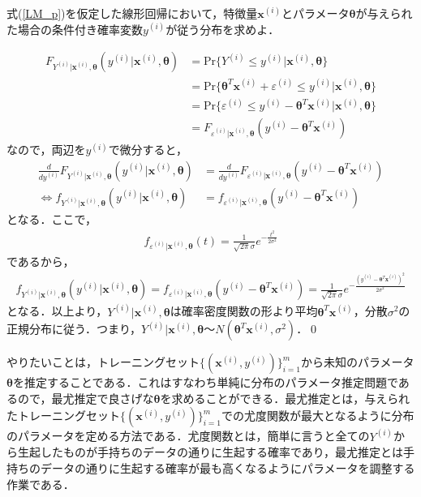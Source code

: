 \begin{qu}
式(\ref{LM_p})を仮定した線形回帰において，特徴量${\bm x}^{(i)}$とパラメータ${\bm \theta}$が与えられた場合の条件付き確率変数$y^{(i)}$が従う分布を求めよ．
\end{qu}
\begin{ans}
\begin{align*}
F_{Y^{(i)}|{\bm x}^{(i)},{\bm \theta}}(y^{(i)}|{\bm x}^{(i)},{\bm \theta})&=\mathrm{Pr}\{Y^{(i)} \leq y^{(i)}|{\bm x}^{(i)},{\bm \theta}\}	\\
&=\mathrm{Pr}\{{\bm \theta}^T {\bm x}^{(i)}+\varepsilon^{(i)} \leq y^{(i)}|{\bm x}^{(i)},{\bm \theta}\}	\\
&=\mathrm{Pr}\{\varepsilon^{(i)} \leq y^{(i)}-{\bm \theta}^T {\bm x}^{(i)}|{\bm x}^{(i)},{\bm \theta}\}\\
&=F_{\varepsilon^{(i)}|{\bm x}^{(i)},{\bm \theta}}(y^{(i)}-{\bm \theta}^T {\bm x}^{(i)})
\end{align*}
なので，両辺を$y^{(i)}$で微分すると，
\begin{align*}
\frac{d}{dy^{(i)}}F_{Y^{(i)}|{\bm x}^{(i)},{\bm \theta}}(y^{(i)}|{\bm x}^{(i)},{\bm \theta})&=\frac{d}{dy^{(i)}}F_{\varepsilon^{(i)}|{\bm x}^{(i)},{\bm \theta}}(y^{(i)}-{\bm \theta}^T {\bm x}^{(i)})\\
\Longleftrightarrow 　　　f_{Y^{(i)}|{\bm x}^{(i)},{\bm \theta}}(y^{(i)}|{\bm x}^{(i)},{\bm \theta}) &= f_{\varepsilon^{(i)}|{\bm x}^{(i)},{\bm \theta}}(y^{(i)}-{\bm \theta}^T {\bm x}^{(i)})
\end{align*}
となる．ここで，
\begin{align*}
f_{\varepsilon^{(i)}|{\bm x}^{(i)},{\bm \theta}}(t)=\frac{1}{\sqrt{2\pi }\sigma}e^{-\frac{t^2}{2\sigma^2}}	
\end{align*}
であるから，
\begin{align}
f_{Y^{(i)}|{\bm x}^{(i)},{\bm \theta}}(y^{(i)}|{\bm x}^{(i)},{\bm \theta})=f_{\varepsilon^{(i)}|{\bm x}^{(i)},{\bm \theta}}(y^{(i)}-{\bm \theta}^T {\bm x}^{(i)})=\frac{1}{\sqrt{2\pi }\sigma}e^{-\frac{(y^{(i)}-{\bm \theta}^T {\bm x}^{(i)})^2}{2\sigma^2}}	\label{LR_f}
\end{align}
となる．以上より，$Y^{(i)}|{\bm x}^{(i)},{\bm \theta}$は確率密度関数の形より平均${\bm \theta}^T {\bm x}^{(i)}$，分散$\sigma^2$の正規分布に従う．つまり，$Y^{(i)}|{\bm x}^{(i)},{\bm \theta}〜N({\bm \theta}^T {\bm x}^{(i)},\sigma^2)$．\qed 
\end{ans}

やりたいことは，トレーニングセット$\{({\bm x}^{(i)},y^{(i)})\}_{i=1}^m$から未知のパラメータ${\bm \theta}$を推定することである．これはすなわち単純に分布のパラメータ推定問題であるので，最尤推定で良さげな${\bm \theta}$を求めることができる．最尤推定とは，与えられたトレーニングセット$\{({\bm x}^{(i)},y^{(i)})\}_{i=1}^m$での尤度関数が最大となるように分布のパラメータを定める方法である．尤度関数とは，簡単に言うと全ての$Y^{(i)}$から生起したものが手持ちのデータの通りに生起する確率であり，最尤推定とは手持ちのデータの通りに生起する確率が最も高くなるようにパラメータを調整する作業である．

